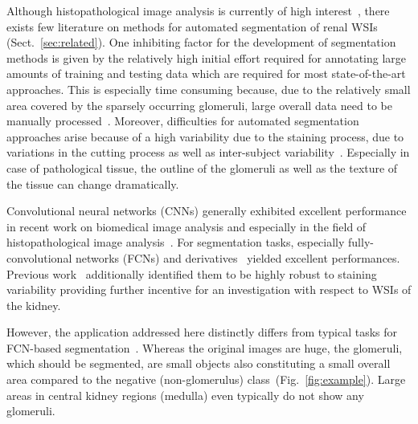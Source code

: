 \documentclass{elsarticle}
\begin{document}
Although histopathological image analysis is currently of high interest~\citep{myBarker16a,myBenTaieb16a,myHou16a,myRonneberger15a,mySertel09a,myVeta16a}, there exists few literature on methods for automated segmentation of renal WSIs (Sect.~\ref{sec:related}).
One inhibiting factor for the development of segmentation methods is given by the relatively high initial effort required for annotating large amounts of training and testing data which are required for most state-of-the-art approaches.
This is especially time consuming because, due to the relatively small area covered by the sparsely occurring glomeruli, large overall data need to be manually processed~\citep{myGadermayr16f}.
Moreover, difficulties for automated segmentation approaches arise because of a high variability due to the staining process, due to variations in the cutting process as well as inter-subject variability~\citep{Gadermayr16e}.
Especially in case of pathological tissue, the outline of the glomeruli as well as the texture of the tissue can change dramatically.

Convolutional neural networks (CNNs) generally exhibited excellent performance in recent work on biomedical image analysis and especially in the field of histopathological image analysis~\citep{myBenTaieb16a,myRonneberger15a}. For segmentation tasks, especially fully-convolutional networks (FCNs) and derivatives~\citep{myBenTaieb16a,Girshick2014,Long2015,myRonneberger15a,Seyedhosseini2013} yielded excellent performances.
Previous work~\citep{Gadermayr17b} additionally identified them to be highly robust to staining variability providing further incentive for an investigation with respect to WSIs of the kidney.

However, the application addressed here distinctly differs from typical tasks for FCN-based segmentation~\citep{myBenTaieb16a,myRonneberger15a}. Whereas the original images are huge, the glomeruli, which should be segmented, are small objects also constituting a small overall area compared to the negative (non-glomerulus) class~(Fig.~\ref{fig:example}). Large areas in central kidney regions (medulla) even typically do not show any glomeruli.
\end{document}
